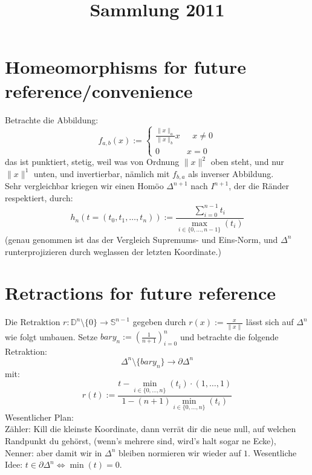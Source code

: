 \documentclass[11pt,twoside,a4paper]{scrbook} %
\title{Sammlung 2011}
\begin{document}
\section{Homeomorphisms for future reference/convenience}
Betrachte die Abbildung:
$$f_{a,b}(x):=\begin{cases}\frac{\|x\|_a}{\|x\|_b}x &~~~x\neq 0 \\ 0 & x=0\end{cases}$$
das ist punktiert, stetig, weil was von Ordnung $\|x\|^2$ oben steht, und nur $\|x\|^1$ unten, und invertierbar, n\"amlich mit $f_{b,a}$ als inverser
Abbildung.\\
Sehr vergleichbar kriegen wir einen Hom\"oo $\Delta^{n+1}$ nach $I^{n+1}$, der die R\"ander respektiert, durch:
$$h_n(t=(t_0,t_1,\ldots,t_n)):=\frac{\sum\limits_{i=0}^{n-1}t_i}{\max_{i\in\{0,\ldots,n-1\}}(t_i)}$$
(genau genommen ist das der Vergleich Supremums- und Eins-Norm, und $\Delta^n$ runterprojizieren durch weglassen der letzten Koordinate.)
\section{Retractions for future reference}
Die Retraktion $r\colon \mathbb{D}^n\setminus\{0\} \rightarrow \mathbb{S}^{n-1}$  gegeben durch $r(x) := \frac{x}{\|x\|}$ l\"asst sich auf $\Delta^n$ wie folgt umbauen.
Setze $bary_n:=\left(\frac{1}{n+1}\right)_{i=0}^n$ und betrachte die folgende Retraktion:
$$\Delta^n\setminus\{bary_n\}\rightarrow \partial\Delta^n$$ mit:
$$r(t):= \frac{t-\min_{i\in\{0,\ldots,n\}}(t_i)\cdot(1,\ldots,1)}
              {1-(n+1)\min_{i\in\{0,\ldots,n\}}(t_i)}$$
Wesentlicher Plan: \\Z\"ahler: Kill die kleinste Koordinate, dann verr\"at dir die neue null, auf welchen Randpunkt du geh\"orst, (wenn's mehrere sind, wird's halt sogar ne Ecke), \\
Nenner: aber damit wir in $\Delta^n$ bleiben normieren wir wieder auf $1$. Wesentliche Idee: $t\in \partial \Delta^n \Leftrightarrow \min(t) = 0$.
\end{document}
